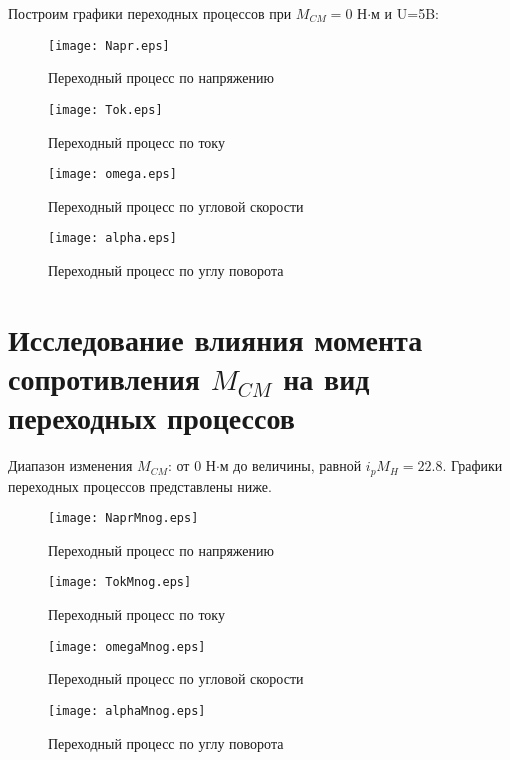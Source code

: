 \documentclass[12pt,a4paper]{article}
\begin{document}
\newpage
Построим графики переходных процессов при $M_{CM}=0$ Н$\cdot$м и U=5B:
\begin{figure}[H]
	\centering
	    \texttt{[image: Napr.eps]}
		\caption{Переходный процесс по напряжению}
\end{figure}	
\begin{figure}[H]
	 \centering	
		\texttt{[image: Tok.eps]}
		\caption{Переходный процесс по току}
\end{figure}
\begin{figure}[H]	
 \centering
		\texttt{[image: omega.eps]}
		\caption{Переходный процесс по угловой скорости}
\end{figure}
\begin{figure}[H]
	 \centering
		\texttt{[image: alpha.eps]}
		\caption{Переходный процесс по углу поворота}
\end{figure}
	

\newpage
\section{Исследование влияния момента сопротивления $M_{CM}$ на вид переходных процессов}
Диапазон изменения $M_{CM}$: от 0 Н$\cdot$м до величины, равной $i_pM_H=22.8$. Графики переходных процессов представлены ниже.
\begin{figure}[H]
	\centering
	\texttt{[image: NaprMnog.eps]}
	\caption{Переходный процесс по напряжению}
\end{figure}	
\begin{figure}[H]
	 \centering	
	\texttt{[image: TokMnog.eps]}
	\caption{Переходный процесс по току}
\end{figure}
\begin{figure}[H]	
	 \centering
	\texttt{[image: omegaMnog.eps]}
	\caption{Переходный процесс по угловой скорости}
\end{figure}
\begin{figure}[H]
	 \centering
	\texttt{[image: alphaMnog.eps]}
	\caption{Переходный процесс по углу поворота}
\end{figure}

\newpage
\end{document}

